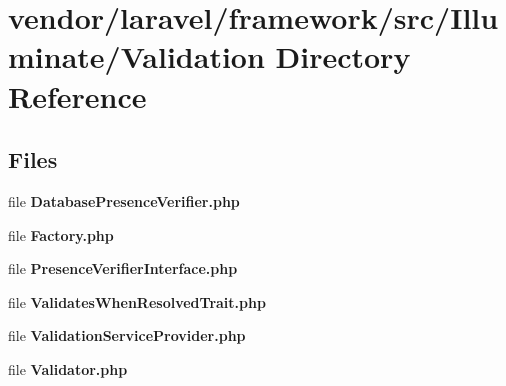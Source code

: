 \section{vendor/laravel/framework/src/\+Illuminate/\+Validation Directory Reference}
\label{dir_bdcfd0218b62fac86c652b0a7e349a5c}
\subsection*{Files}
\begin{DoxyCompactItemize}
\item 
file {\bf Database\+Presence\+Verifier.\+php}
\item 
file {\bf Factory.\+php}
\item 
file {\bf Presence\+Verifier\+Interface.\+php}
\item 
file {\bf Validates\+When\+Resolved\+Trait.\+php}
\item 
file {\bf Validation\+Service\+Provider.\+php}
\item 
file {\bf Validator.\+php}
\end{DoxyCompactItemize}
